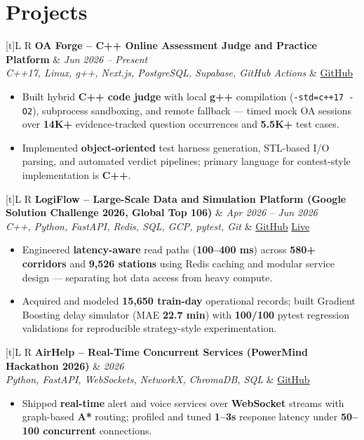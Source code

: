 \documentclass[a4paper,10pt]{article}
\newcommand{\resumeProject}[4]{
  \vspace{0.5mm}
  \noindent
  \begin{tabularx}{\textwidth}[t]{L R}
    \textbf{#1} & \textit{#3} \\
    \textit{#2} & #4 \\
  \end{tabularx}
  \vspace{-0.5mm}
}
\begin{document}
\section{Projects}
\small

\resumeProject
  {OA Forge -- C++ Online Assessment Judge and Practice Platform}
  {C++17, Linux, g++, Next.js, PostgreSQL, Supabase, GitHub Actions}
  {Jun 2026 -- Present}
  {\href{https://github.com/Ojas-Srivastava05/resume-optimiser}{GitHub}}
\begin{itemize}
  \item Built hybrid \textbf{C++ code judge} with local \textbf{g++} compilation (\texttt{-std=c++17 -O2}), subprocess sandboxing, and remote fallback --- timed mock OA sessions over \textbf{14K+} evidence-tracked question occurrences and \textbf{5.5K+} test cases.
  \item Implemented \textbf{object-oriented} test harness generation, STL-based I/O parsing, and automated verdict pipelines; primary language for contest-style implementation is \textbf{C++}.
\end{itemize}

\resumeProject
  {LogiFlow -- Large-Scale Data and Simulation Platform (Google Solution Challenge 2026, Global Top 106)}
  {C++, Python, FastAPI, Redis, SQL, GCP, pytest, Git}
  {Apr 2026 -- Jun 2026}
  {\href{https://github.com/Ojas-Srivastava05/LogiFlow-Solution-Challenge-2026}{GitHub} \textbar{} \href{https://logi-flow-solution-challenge-2026.vercel.app/}{Live}}
\begin{itemize}
  \item Engineered \textbf{latency-aware} read paths (\textbf{100--400 ms}) across \textbf{580+ corridors} and \textbf{9,526 stations} using Redis caching and modular service design --- separating hot data access from heavy compute.
  \item Acquired and modeled \textbf{15,650 train-day} operational records; built Gradient Boosting delay simulator (MAE \textbf{22.7 min}) with \textbf{100/100} pytest regression validations for reproducible strategy-style experimentation.
\end{itemize}

\resumeProject
  {AirHelp -- Real-Time Concurrent Services (PowerMind Hackathon 2026)}
  {Python, FastAPI, WebSockets, NetworkX, ChromaDB, SQL}
  {2026}
  {\href{https://github.com/Ojas-Srivastava05/AirHelp-AI-Airport-Assistant}{GitHub}}
\begin{itemize}
  \item Shipped \textbf{real-time} alert and voice services over \textbf{WebSocket} streams with graph-based \textbf{A*} routing; profiled and tuned \textbf{1--3s} response latency under \textbf{50--100 concurrent} connections.
\end{itemize}
\end{document}
